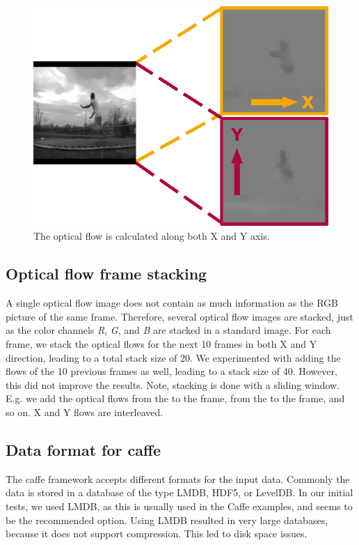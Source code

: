 \begin{figure}[!htb]
        \centering
        \includegraphics[scale=.7]{images/optical_flow.eps}
        \caption{The optical flow is calculated along both X and Y axis.}
        \label{fig:optical_flow}
\end{figure}

\subsection{Optical flow frame stacking}
A single optical flow image does not contain as much information as the RGB picture of the same frame.
Therefore, several optical flow images are stacked, just as the color channels \emph{R}, \emph{G}, and \emph{B} are stacked in a standard image.
For each frame, we stack the optical flows for the next 10 frames in both X and Y direction, leading to a total stack size of 20.
We experimented with adding the flows of the 10 previous frames as well, leading to a stack size of 40.
However, this did not improve the results.
Note, stacking is done with a sliding window. E.g. we add the optical flows from the  to the  frame, from the  to the  frame, and so on. X and Y flows are interleaved.


\subsection{Data format for caffe}
The caffe framework accepts different formats for the input data. Commonly the data is stored in a database of the type LMDB, HDF5, or LevelDB.
In our initial tests, we used LMDB, as this is usually used in the Caffe examples, and seems to be the recommended option.
Using LMDB resulted in very large databases, because it does not support compression.
This led to disk space issues.

